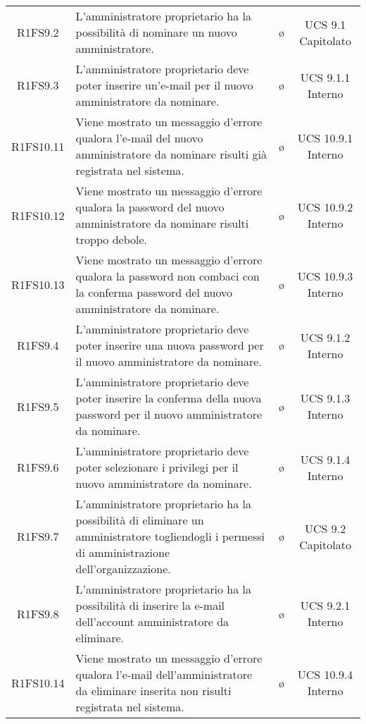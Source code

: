 {\begin{longtable}{ c C{6.5cm} c c}
R1FS9.2 & L'amministratore proprietario ha la possibilità di nominare un nuovo amministratore. & \o & UCS 9.1 Capitolato\\

R1FS9.3 & L'amministratore proprietario deve poter inserire un'e-mail per il nuovo amministratore da nominare. & \o & UCS 9.1.1 Interno\\

R1FS10.11 & Viene mostrato un messaggio d'errore qualora l'e-mail del nuovo amministratore da nominare risulti già registrata nel sistema. & \o & UCS 10.9.1 Interno\\

R1FS10.12 & Viene mostrato un messaggio d'errore qualora la password del nuovo amministratore da nominare risulti troppo debole. & \o & UCS 10.9.2 Interno\\

R1FS10.13 & Viene mostrato un messaggio d'errore qualora la password non combaci con la conferma password del nuovo amministratore da nominare. & \o & UCS 10.9.3 Interno\\

R1FS9.4 & L'amministratore proprietario deve poter inserire una nuova password per il nuovo amministratore da nominare. & \o & UCS 9.1.2 Interno\\

R1FS9.5 & L'amministratore proprietario deve poter inserire la conferma della nuova password per il nuovo amministratore da nominare. & \o & UCS 9.1.3 Interno\\

R1FS9.6 & L'amministratore proprietario deve poter selezionare i privilegi per il nuovo amministratore da nominare. & \o & UCS 9.1.4 Interno\\

R1FS9.7 & L'amministratore proprietario ha la possibilità di eliminare un amministratore togliendogli i permessi di amministrazione dell'organizzazione. & \o & UCS 9.2 Capitolato\\

R1FS9.8 & L'amministratore proprietario ha la possibilità di inserire la e-mail dell'account amministratore da eliminare. & \o & UCS 9.2.1 Interno\\

R1FS10.14 & Viene mostrato un messaggio d'errore qualora l'e-mail dell'amministratore da eliminare inserita non risulti registrata nel sistema. & \o & UCS 10.9.4 Interno\\


\end{longtable}}
